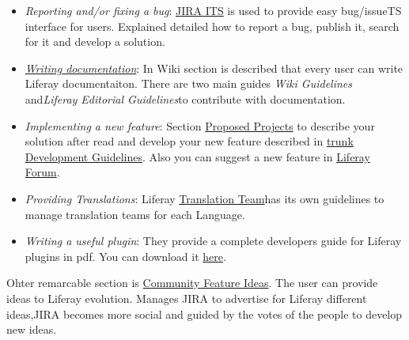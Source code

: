 \begin{itemize}
	\item \textit{Reporting and/or fixing a bug}: \href{http://issues.liferay.com/secure/Dashboard.jspa}{JIRA ITS} is used to provide easy bug/issueTS interface for users. Explained detailed how to report a bug, publish it, search for it and develop a solution.
	\item \href{http://www.liferay.com/community/wiki/-/wiki/Main/Contributing#section-Contributing-Write+documentation}{\textit{Writing documentation}}: In Wiki section is described that every user can write Liferay documentaiton. There are two main guides \textit{Wiki Guidelines} and\textit{Liferay Editorial Guidelines}to contribute with documentation.
	\item \textit{Implementing a new feature}: Section \href{http://www.liferay.com/community/wiki/-/wiki/Proposals/FrontPage}{Proposed Projects} to describe your solution after read and develop your new feature described in \href{http://www.liferay.com/community/wiki/-/wiki/Main/Liferay+Core+Development+Guidelines}{trunk Development Guidelines}. Also you can suggest a new feature in \href{http://www.liferay.com/web/guest/community/forums/-/message_boards/category/1108052}{Liferay Forum}.
	\item \textit{Providing Translations}: Liferay \href{http://www.liferay.com/community/wiki/-/wiki/Main/Translation+Team}{Translation Team}has its own guidelines to manage translation teams for each Language.
	\item \textit{Writing a useful plugin}: They provide a complete developers guide for Liferay plugins in pdf. You can download it \href{http://docs.liferay.com/portal/6.0/official/liferay-developer-guide-6.0.pdf}{here}.
\end{itemize} Ohter remarcable section is \href{http://www.liferay.com/community/ideas}{Community Feature Ideas}. The user can provide ideas to Liferay evolution. Manages JIRA to advertise for Liferay different ideas,JIRA becomes more social and guided by the votes of the people to develop new ideas.

